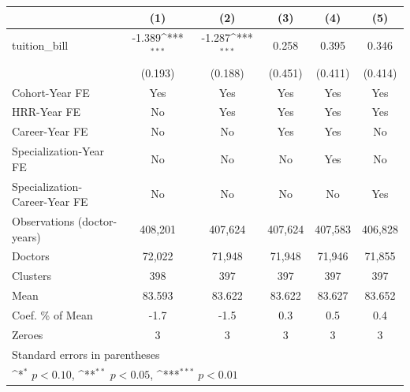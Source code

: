 {
\def\sym#1{\ifmmode^{#1}\else\(^{#1}\)\fi}
\begin{tabular}{l*{5}{c}}
\hline\hline
                    &\multicolumn{1}{c}{(1)}         &\multicolumn{1}{c}{(2)}         &\multicolumn{1}{c}{(3)}         &\multicolumn{1}{c}{(4)}         &\multicolumn{1}{c}{(5)}         \\
\hline
tuition\_bill        &      -1.389\sym{***}&      -1.287\sym{***}&       0.258         &       0.395         &       0.346         \\
                    &     (0.193)         &     (0.188)         &     (0.451)         &     (0.411)         &     (0.414)         \\
[1em]
Cohort-Year FE      &         Yes         &         Yes         &         Yes         &         Yes         &         Yes         \\
[1em]
HRR-Year FE         &          No         &         Yes         &         Yes         &         Yes         &         Yes         \\
[1em]
Career-Year FE      &          No         &          No         &         Yes         &         Yes         &          No         \\
[1em]
Specialization-Year FE&          No         &          No         &          No         &         Yes         &          No         \\
[1em]
Specialization-Career-Year FE&          No         &          No         &          No         &          No         &         Yes         \\
\hline
Observations (doctor-years)&     408,201         &     407,624         &     407,624         &     407,583         &     406,828         \\
Doctors             &      72,022         &      71,948         &      71,948         &      71,946         &      71,855         \\
Clusters            &         398         &         397         &         397         &         397         &         397         \\
Mean                &      83.593         &      83.622         &      83.622         &      83.627         &      83.652         \\
Coef. \% of Mean    &        -1.7         &        -1.5         &         0.3         &         0.5         &         0.4         \\
Zeroes              &           3         &           3         &           3         &           3         &           3         \\
\hline\hline
\multicolumn{6}{l}{\footnotesize Standard errors in parentheses}\\
\multicolumn{6}{l}{\footnotesize \sym{*} \(p<0.10\), \sym{**} \(p<0.05\), \sym{***} \(p<0.01\)}\\
\end{tabular}
}
